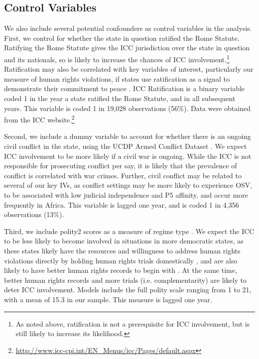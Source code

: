 \subsection*{Control Variables}

We also include several potential confounders as control variables in the analysis. First, we control for whether the state in question ratified the Rome Statute. Ratifying the Rome Statute gives the ICC jurisdiction over the state in question and its nationals, so is likely to increase the chances of ICC involvement.\footnote{As noted above, ratification is not a prerequisite for ICC involvement, but is still likely to increase its likelihood.} Ratification may also be correlated with key variables of interest, particularly our measure of human rights violations, if states use ratification as a signal to demonstrate their commitment to peace \citep{simmons2010credible}. ICC Ratification is a binary variable coded 1 in the year a state ratified the Rome Statute, and in all subsequent years. This variable is coded 1 in 19,028 observations (56\%). Data were obtained from the ICC website.\footnote{\url{http://www.icc-cpi.int/EN\_Menus/icc/Pages/default.aspx}}

Second, we include a dummy variable to account for whether there is an ongoing civil conflict in the state, using the UCDP Armed Conflict Dataset \citep{themner2012armed}. We expect ICC involvement to be more likely if a civil war is ongoing. While the ICC is not responsible for prosecuting conflict per say, it is likely that the prevalence of conflict is correlated with war crimes. Further, civil conflict may be related to several of our key IVs, as conflict settings may be more likely to experience OSV, to be associated with low judicial independence and P5 affinity, and occur more frequently in Africa. This variable is lagged one year, and is coded 1 in 4,356 observations (13\%).

Third, we include polity2 scores as a measure of regime type \citep{marshall2018polity}. We expect the ICC to be less likely to become involved in situations in more democratic states, as these states likely have the resources and willingness to address human rights violations directly by holding human rights trials domestically \citep{kim2010explaining, herz1982dictatorship}, and are also likely to have better human rights records to begin with \citep{davenport:armstrongii:2004, davenport2007state}. At the same time, better human rights records and more trials (i.e. complementarity) are likely to deter ICC involvement. Models include the full polity scale ranging from 1 to 21, with a mean of 15.3 in our sample. This measure is lagged one year.

